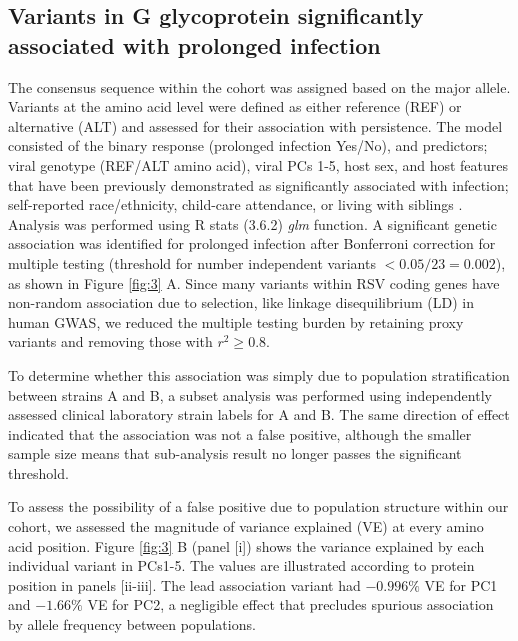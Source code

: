 \documentclass{article} %
\begin{document}
\subsection{Variants in G glycoprotein significantly associated with prolonged infection}
The consensus sequence within the cohort was assigned based on the major allele.
Variants at the amino acid level were defined as either reference (REF) or alternative (ALT) and assessed for their association with persistence.
The model consisted of 
the binary response (prolonged infection Yes/No),
and predictors; viral genotype (REF/ALT amino acid), viral PCs 1-5, host sex, and host features that have been previously demonstrated as significantly associated with infection;
self-reported race/ethnicity, child-care attendance, or living with siblings
\citep{hall1976respiratory}.
Analysis was performed using R stats (3.6.2) \textit{glm} function. 
A significant genetic association was identified for prolonged infection after Bonferroni correction for multiple testing (threshold for number independent variants $< 0.05/23 = 0.002$), 
as shown in 
Figure \ref{fig:3} A. 
Since many variants within RSV coding genes have non-random association due to selection, like linkage disequilibrium (LD) in human GWAS, 
we reduced the multiple testing burden by retaining proxy variants and removing those with
$r^2 \ge 0.8$.

To determine whether this association was simply due to population stratification between strains A and B, a subset analysis was performed using independently assessed clinical laboratory strain labels for A and B.
The same direction of effect indicated that the association was not a false positive, although the smaller sample size means that sub-analysis result no longer passes the significant threshold. 

To assess the possibility of a false positive due to population structure within our cohort,
we assessed the magnitude of variance explained (VE) at every amino acid position.
Figure \ref{fig:3} B (panel [i]) shows the variance explained by each individual variant in PCs1-5.
The values are illustrated according to protein position in panels [ii-iii].
The lead association variant had 
$-0.996\%$ VE for PC1 and $-1.66\%$ VE for PC2,
a negligible effect that precludes spurious association by allele frequency between populations.
\end{document}
